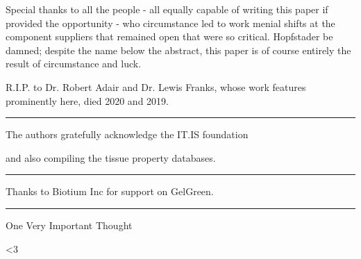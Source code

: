 \documentclass[paper.tex]{subfiles}
\begin{document}
Special thanks to all the people - all equally capable of writing this paper if provided the opportunity - who circumstance led to work menial shifts at the component suppliers that remained open that were so critical. Hopfstader be damned; despite the name below the abstract, this paper is of course entirely the result of circumstance and luck. 

R.I.P. to Dr. Robert Adair and Dr. Lewis Franks, whose work features prominently here, died 2020 and 2019.



\rule{\linewidth}{0.2pt}

The authors gratefully acknowledge the IT.IS foundation 

and also compiling the tissue property databases.


\rule{\linewidth}{0.2pt}

Thanks to Biotium Inc for support on GelGreen.

\rule{\linewidth}{0.2pt}

One Very Important Thought


{\Large {\verbatim <3}}
\end{document}
